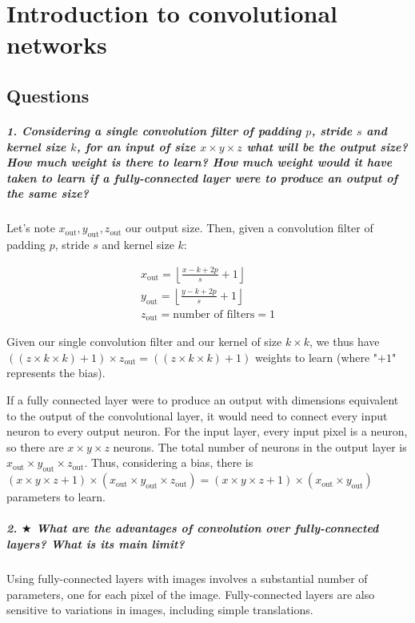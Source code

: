 \chapter{Introduction to convolutional networks}
\section{Questions}
\paragraph{1. Considering a single convolution filter of padding $p$, stride $s$ and kernel size $k$, for an input of size $x \times y \times z$ what will be the output size? How much weight is there to learn? How much weight would it have taken to learn if a fully-connected layer were to produce an output of the same size?}
Let's note $x_{\text{out}}, y_{\text{out}}, z_{\text{out}}$ our output size. Then, given a convolution filter of padding $p$, stride $s$ and kernel size $k$:

\begin{align}
    \label{eq:1} x_{\text{out}} = \left\lfloor\frac{x - k + 2p}{s} + 1 \right\rfloor \\
    \label{eq:2} y_{\text{out}} = \left\lfloor\frac{y - k + 2p}{s} + 1 \right\rfloor \\
    \label{eq:3} z_{\text{out}} = \text{number of filters} = 1
\end{align}

Given our single convolution filter and our kernel of size $ k \times k $, we thus have $ ((z \times k \times k) + 1) \times z_{\text{out}} = ((z \times k \times k) + 1) $ weights to learn (where "$+1$" represents the bias).

If a fully connected layer were to produce an output with dimensions equivalent to the output of the convolutional layer, it would need to connect every input neuron to every output neuron. For the input layer, every input pixel is a neuron, so there are \(x \times y \times z\) neurons. The total number of neurons in the output layer is \( x_{\text{out}} \times y_{\text{out}} \times z_{\text{out}} \). Thus, considering a bias, there is \((x \times y \times z + 1) \times (x_{\text{out}} \times y_{\text{out}} \times z_{\text{out}}) = (x \times y \times z + 1) \times (x_{\text{out}} \times y_{\text{out}}) \) parameters to learn.

\paragraph{2. $ \bigstar $ What are the advantages of convolution over fully-connected layers? What is its main limit?}
Using fully-connected layers with images involves a substantial number of parameters, one for each pixel of the image. Fully-connected layers are also sensitive to variations in images, including simple translations.

